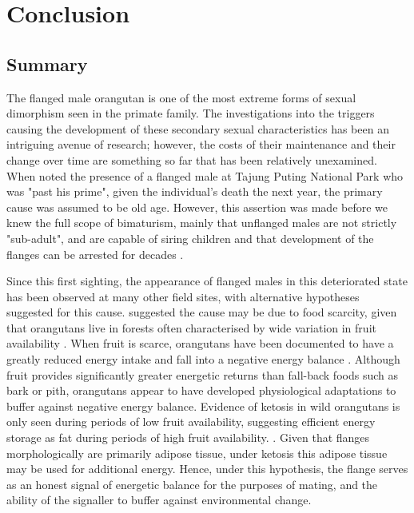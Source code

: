 
\chapter{Conclusion}

\section{Summary}

The flanged male orangutan is one of the most extreme forms of sexual dimorphism seen in the primate family. The investigations into the triggers causing the development of these secondary sexual characteristics has been an intriguing avenue of research; however, the costs of their maintenance and their change over time are something so far that has been relatively unexamined. When \citet{Galdikas.1978} noted the presence of a flanged male at Tajung Puting National Park who was "past his prime", given the individual's death the next year, the primary cause was assumed to be old age. However, this assertion was made before we knew the full scope of bimaturism, mainly that unflanged males are not strictly "sub-adult", and are capable of siring children and that development of the flanges can be arrested for decades \citep{Banes.2015cth, Kunz.2023, Prasetyo.2021}. 

Since this first sighting, the appearance of flanged males in this deteriorated state has been observed at many other field sites, with alternative hypotheses suggested for this cause. \citet{Dunkel.2013} suggested the cause may be due to food scarcity, given that orangutans live in forests often characterised by wide variation in fruit availability \citep{Morrogh-Bernard.2011}. When fruit is scarce, orangutans have been documented to have a greatly reduced energy intake and fall into a negative energy balance \citep{Erb.2018}. Although fruit provides significantly greater energetic returns than fall-back foods such as bark or pith, orangutans appear to have developed physiological adaptations to buffer against negative energy balance. Evidence of ketosis in wild orangutans is only seen during periods of low fruit availability, suggesting efficient energy storage as fat during periods of high fruit availability. \citep{Erb.2018, Knott.1998}. Given that flanges morphologically are primarily adipose tissue, under ketosis this adipose tissue may be used for additional energy. Hence, under this hypothesis, the flange serves as an honest signal of energetic balance for the purposes of mating, and the ability of the signaller to buffer against environmental change. 


